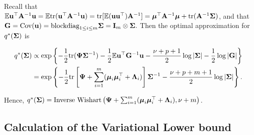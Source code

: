 \documentclass{amsart}[12pt]
\begin{document}
Recall that
$\mathbb{E} {\bf u}^\top {\bf A}^{-1} {\bf u} = \mathbb{E} \text{tr}({\bf u}^\top {\bf A}^{-1} {\bf u}) = \text{tr} [\mathbb{E} ({\bf u} {\bf u}^\top) {\bf A}^{-1}] = {\boldsymbol \mu}^\top {\bf A}^{-1} {\boldsymbol \mu} + \text{tr}{({\bf A}^{-1} {\boldsymbol\Sigma})}$,
and that ${\bf G} = \text{Cov}({\bf u}) = \text{blockdiag}_{1 \leq i \leq m} {\boldsymbol \Sigma} = {\bf I}_m \otimes {\boldsymbol\Sigma}.$ Then the
optimal approximation for $q^*({\boldsymbol \Sigma})$ is

\begin{align*}
	q^*({\boldsymbol \Sigma}) & \propto \exp \left \{ -\frac{1}{2} \text{tr} ({\boldsymbol \Psi} {\boldsymbol \Sigma}^{-1}) - \frac{1}{2} \mathbb{E} {\bf u}^\top {\bf G}^{-1} {\bf u}               
	- \frac{\nu + p + 1}{2} \log |{\boldsymbol \Sigma}| - \frac{1}{2} \log |{\bf G}| \right \} \\
	             & =\exp \left \{ -\frac{1}{2} \text{tr} \left[{\boldsymbol \Psi} + \sum_{i=1}^m ({\boldsymbol \mu}_i {\boldsymbol \mu}_i^\top + {\boldsymbol \Lambda}_i) \right] {\boldsymbol\Sigma}^{-1}
	- \frac{\nu + p + m + 1}{2} \log |{\boldsymbol \Sigma}| \right \}.
\end{align*}

\noindent Hence, $q^*({\boldsymbol \Sigma}) = \text{Inverse Wishart} \left( {\boldsymbol \Psi} + \sum_{i=1}^m ({\boldsymbol \mu}_i {\boldsymbol \mu}_i^\top + {\boldsymbol \Lambda}_i), \nu + m \right)$.


\subsection{Calculation of the Variational Lower bound}
	
\end{document}
